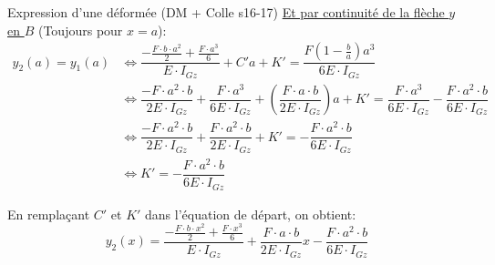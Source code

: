 \documentclass{article}
\begin{document}
{\begin{exemple}[label=ex2]{Expression d'une déformée (DM + Colle s16-17)}
\underline{Et par continuité de la flèche $y$ en $B$} \qquad (Toujours pour $x=a$):
\begin{align*}
y_2(a) = y_1(a) &\iff \dfrac{-\frac{F\cdot b\cdot a^2}{2}+\frac{F\cdot a^3}{6}}{E\cdot I_{Gz}}+C'a+K' = \dfrac{F\left(1-\frac{b}{a}\right)a^3}{6E\cdot I_{Gz}}\\
&\iff \dfrac{-F\cdot a^2\cdot b}{2E\cdot I_{Gz}} + \dfrac{F\cdot a^3}{6E\cdot I_{Gz}} + \left(\dfrac{F\cdot a\cdot b}{2E\cdot I_{Gz}}\right)a + K' = \dfrac{F\cdot a^3}{6E\cdot I_{Gz}} - \dfrac{F\cdot a^2\cdot b}{6E\cdot I_{Gz}} \\
&\iff \dfrac{-F\cdot a^2\cdot b}{2E\cdot I_{Gz}} + \dfrac{F\cdot a^2\cdot b}{2E\cdot I_{Gz}} + K' = -\dfrac{F\cdot a^2\cdot b}{6E\cdot I_{Gz}} \\
&\iff K' = -\dfrac{F\cdot a^2\cdot b}{6E\cdot I_{Gz}}
\end{align*}

En remplaçant $C'$ et $K'$ dans l'équation de départ, on obtient:
$$y_2(x) = \dfrac{-\frac{F\cdot b\cdot x^2}{2}+\frac{F\cdot x^3}{6}}{E\cdot I_{Gz}} + \dfrac{F\cdot a\cdot b}{2E\cdot I_{Gz}}x - \dfrac{F\cdot a^2\cdot b}{6E\cdot I_{Gz}}$$


\end{exemple}}
\end{document}
